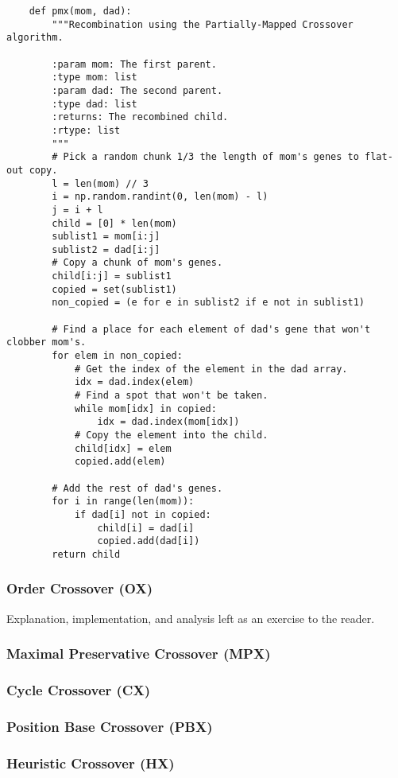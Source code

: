 \documentclass{article}
\begin{document}
\begin{verbatim}
    def pmx(mom, dad):
        """Recombination using the Partially-Mapped Crossover algorithm.

        :param mom: The first parent.
        :type mom: list
        :param dad: The second parent.
        :type dad: list
        :returns: The recombined child.
        :rtype: list
        """
        # Pick a random chunk 1/3 the length of mom's genes to flat-out copy.
        l = len(mom) // 3
        i = np.random.randint(0, len(mom) - l)
        j = i + l
        child = [0] * len(mom)
        sublist1 = mom[i:j]
        sublist2 = dad[i:j]
        # Copy a chunk of mom's genes.
        child[i:j] = sublist1
        copied = set(sublist1)
        non_copied = (e for e in sublist2 if e not in sublist1)

        # Find a place for each element of dad's gene that won't clobber mom's.
        for elem in non_copied:
            # Get the index of the element in the dad array.
            idx = dad.index(elem)
            # Find a spot that won't be taken.
            while mom[idx] in copied:
                idx = dad.index(mom[idx])
            # Copy the element into the child.
            child[idx] = elem
            copied.add(elem)

        # Add the rest of dad's genes.
        for i in range(len(mom)):
            if dad[i] not in copied:
                child[i] = dad[i]
                copied.add(dad[i])
        return child
\end{verbatim}

\subsubsection{Order Crossover (OX)}
Explanation, implementation, and analysis left as an exercise to the reader.
\subsubsection{Maximal Preservative Crossover (MPX)}
\subsubsection{Cycle Crossover (CX)}
\subsubsection{Position Base Crossover (PBX)}
\subsubsection{Heuristic Crossover (HX)}
\end{document}
